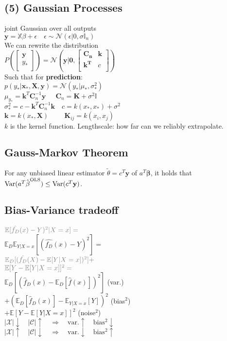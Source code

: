 \subsection*{(5) Gaussian Processes}
joint Gaussian over all outputs\\
$\mathbf{y}=\mathbb{X}\beta+\epsilon \quad \epsilon\sim \mathcal{N}(\epsilon|0,\sigma\mathbb{I}_n)$\\
We can rewrite the distribution\\
$P(\begin{bmatrix}
\mathbf{y}\\
y_*\\
\end{bmatrix}){=}\mathcal{N}(\mathbf{y}|\mathbf{0},\begin{bmatrix}
\mathbf{C_n} & \mathbf{k} \\
\mathbf{k^T} & c \\
\end{bmatrix})$\\
Such that for \textbf{prediction}:\\
$p(y_*|\mathbf{x_*}, \mathbf{X}, \mathbf{y}){=} \mathcal{N}(y_*|\mu_{*}, \sigma^2_{*})$\\
$\mu_{y_*} = \mathbf{k}^T\mathbf{C}_n^{-1}\mathbf{y}\quad\ \  \mathbf{C}_n=\mathbf{K}+\sigma^2\mathbb{I}$\\
$\sigma^2_{*}{=}c{-}\mathbf{k}^T\mathbf{C}_n^{-1}\mathbf{k}\quad c{=}k(x_*,x_*){+}\sigma^2$\\
$\mathbf{k}=k(x_*,\mathbf{X})\quad\ \ \ \ \ \ \mathbf{K}_{ij}=k(x_i,x_j)$\\
$k$ is the kernel function. Lengthscale: how far can we reliably extrapolate.


\subsection*{Gauss-Markov Theorem}
For any unbiased linear estimator $\tilde{\theta} = c^T\mathbf{y}$ of $a^T\mathbf{\beta}$, it holds that $\mathrm{Var}(a^T\hat{\kern0pt \beta}^{\mathrm{OLS}}) \leq \mathrm{Var}(c^T\mathbf{y})$.

\subsection*{Bias-Variance tradeoff}
$\color{gray}\mathbb{E}[\hat{f_D}(x)-Y)^2|X=x]=$\\
$\mathbb{E}_D\mathbb{E}_{Y|X=x}[(\hat{f_D}(x)-Y)^2]=$\\
$\color{gray}\mathbb{E}_D[(\hat{f_D}(X)-\mathbb{E}[Y|X=x])^2]+$\\$\color{gray}\mathbb{E}[Y-\mathbb{E}[Y|X=x]]^2=$\\
$\mathbb{E}_D[(\hat{f}_D(x)-\mathbb{E}_D[\hat{f}(x)])^2]$ (var.)\\
$+(\mathbb{E}_D[\hat{f}_D(x)]-\mathbb{E}_{Y|X=x}[Y])^2$ (bias$^2$)\\
$+\mathbb{E}[Y-\mathbb{E}[Y|X=x]]^2$ (noise$^2$)\\

$|\mathcal{X}|\downarrow \quad|\mathcal{C}|\uparrow\quad\Rightarrow\quad\mathrm{var.}\uparrow\quad\mathrm{bias^2}\downarrow $\\
$|\mathcal{X}|\uparrow \quad|\mathcal{C}|\downarrow\quad\Rightarrow\quad\mathrm{var.}\downarrow\quad\mathrm{bias^2}\uparrow $
